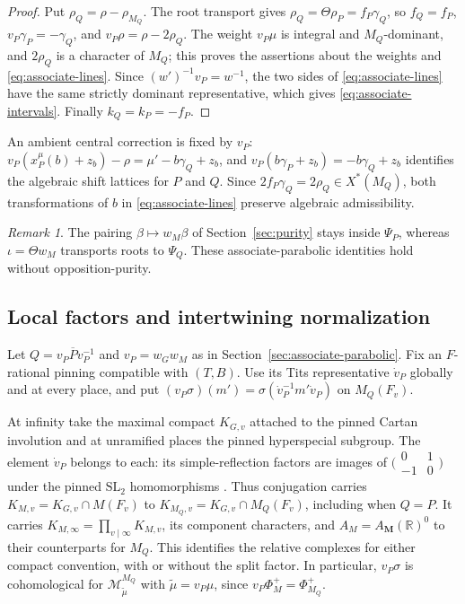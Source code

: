 \documentclass[12pt]{amsart}
\numberwithin{equation}{section}
\theoremstyle{plain}
\theoremstyle{definition}
\theoremstyle{remark}
\newtheorem{remark}[theorem]{Remark}
\renewcommand{\bar}{\overline}
\newcommand{\cM}{\mathcal M}
\begin{document}
\begin{proof}
Put $\rho_Q=\rho-\rho_{M_Q}$. The root transport gives $\rho_Q=\Theta\rho_P=f_P\gamma_Q$, so $f_Q=f_P$, $v_P\gamma_P=-\gamma_Q$, and $v_P\rho=\rho-2\rho_Q$. The weight $v_P\mu$ is integral and $M_Q$-dominant, and $2\rho_Q$ is a character of $M_Q$; this proves the assertions about the weights and \eqref{eq:associate-lines}. Since $(w')^{-1}v_P=w^{-1}$, the two sides of \eqref{eq:associate-lines} have the same strictly dominant representative, which gives
\eqref{eq:associate-intervals}. Finally $k_Q=k_P=-f_P$.
\end{proof}

An ambient central correction is fixed by $v_P$: $v_P(x_P^\mu(b)+z_b)-\rho=\mu'-b\gamma_Q+z_b$, and $v_P(b\gamma_P+z_b)=-b\gamma_Q+z_b$ identifies the algebraic shift lattices for $P$ and $Q$. Since $2f_P\gamma_Q=2\rho_Q\in X^*(M_Q)$, both transformations of $b$ in \eqref{eq:associate-lines} preserve algebraic admissibility.

\begin{remark}\label{rem:associate-versus-local-opposition}
The pairing $\beta\mapsto w_M\beta$ of Section~\ref{sec:purity} stays inside $\Psi_P$, whereas $\iota=\Theta w_M$ transports roots to $\Psi_Q$. These associate-parabolic identities hold without opposition-purity.
\end{remark}

\subsection{Local factors and intertwining normalization}
\label{sec:factor-conventions}
Let $Q=v_P\bar Pv_P^{-1}$ and $v_P=w_Gw_M$ as in Section~\ref{sec:associate-parabolic}. Fix an $F$-rational pinning compatible with $(T,B)$. Use its Tits representative $\dot v_P$ globally and at every place, and put $(v_P\sigma)(m')=\sigma(\dot v_P^{-1}m'\dot v_P)$ on $M_Q(F_v)$.

At infinity take the maximal compact $K_{G,v}$ attached to the pinned Cartan involution and at unramified places the pinned hyperspecial subgroup. The element $\dot v_P$ belongs to each: its simple-reflection factors are images of $\bigl(\begin{smallmatrix}0&1\\-1&0\end{smallmatrix}\bigr)$ under the pinned $\mathrm{SL}_2$ homomorphisms \cite[proof of Proposition~2.8]{HowardMillson2004}. Thus conjugation carries $K_{M,v}=K_{G,v}\cap M(F_v)$ to $K_{M_Q,v}=K_{G,v}\cap M_Q(F_v)$, including when $Q=P$. It carries $K_{M,\infty}=\prod_{v\mid\infty}K_{M,v}$, its component characters, and $A_M=A_{\mathbf M}(\mathbb R)^0$ to their counterparts for $M_Q$. This identifies the relative complexes for either compact convention, with or without the split factor. In particular, $v_P\sigma$ is cohomological for $\cM^{M_Q}_{\widetilde\mu}$ with $\widetilde\mu=v_P\mu$, since $v_P\Phi_M^+=\Phi_{M_Q}^+$.
\end{document}
